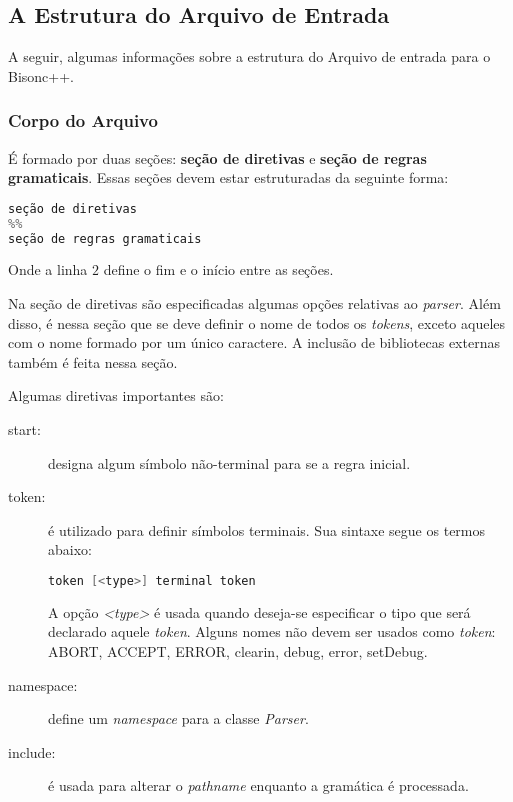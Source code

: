 \begin{apendicesenv}
\subsection{A Estrutura do Arquivo de Entrada}
A seguir, algumas informações sobre a estrutura do Arquivo de entrada para o Bisonc++.

\subsubsection{Corpo do Arquivo}

É formado por duas seções: \textbf{seção de diretivas} e \textbf{seção de regras gramaticais}. Essas seções devem estar estruturadas da seguinte forma:

\begin{lstlisting}[language=c, caption=Corpo do arquivo do bisonc++]
seção de diretivas
%%
seção de regras gramaticais
\end{lstlisting}
\par
\indent Onde a linha $2$ define o fim e o início entre as seções.

Na seção de diretivas são especificadas algumas opções relativas ao \textit{parser}. Além disso, é nessa seção que se deve definir o nome de todos os \textit{tokens}, exceto aqueles com o nome formado por um único caractere. A inclusão de bibliotecas externas também é feita nessa seção.

\par
\indent Algumas diretivas importantes são:

\begin{description}
\item[start:] designa algum símbolo não-terminal para se a regra inicial.
\item[token:] é utilizado para definir símbolos terminais. Sua sintaxe segue os termos abaixo:

\begin{lstlisting}[language=c,  caption=Sintaxe]
token [<type>] terminal token
\end{lstlisting}
A opção \textit{<type>} é usada quando deseja-se especificar o tipo que será declarado aquele \textit{token}. Alguns nomes não devem ser usados como \textit{token}: ABORT, ACCEPT, ERROR, clearin, debug, error, setDebug.
\item[namespace:] define um \textit{namespace} para a classe \textit{Parser}.
\item[include:] é usada para alterar o \textit{pathname} enquanto a gramática é processada.
\end{description}


\end{apendicesenv}
